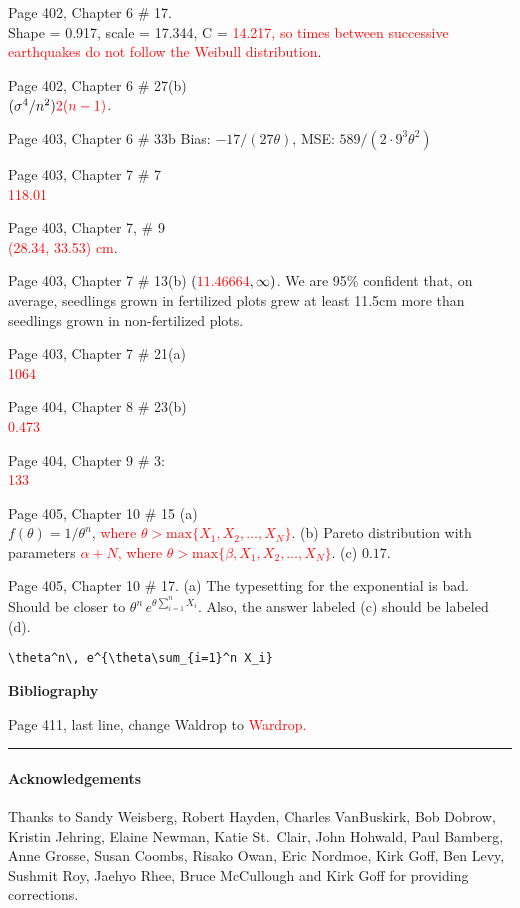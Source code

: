 \documentclass[11pt]{article}
\begin{document}
\bigskip
Page 402, Chapter 6 \# 17. \\
Shape = 0.917, scale = 17.344,
C = \textcolor{red}{14.217, so times between successive earthquakes do
not follow the Weibull distribution}.

\bigskip
Page 402, Chapter 6 \# 27(b) \\
$(\sigma^4/n^2)\color{red}{2(n-1)}$.


\bigskip %
Page 403, Chapter 6 \# 33b Bias: $-17/(27\theta)$, MSE: $589/(2\cdot 9^3\theta^2)$

\bigskip
Page 403, Chapter 7 \# 7 \\
\textcolor{red}{118.01}

\bigskip
Page 403, Chapter 7, \# 9\\
\textcolor{red}{(28.34, 33.53) cm}.

\bigskip %
Page 403, Chapter 7 \# 13(b) $(\textcolor{red}{11.46664}, \infty)$.
We are 95\% confident that, on average,
seedlings grown in fertilized plots grew at least 11.5cm more than seedlings grown
in non-fertilized plots.

\bigskip %
Page 403, Chapter 7 \# 21(a)\\
\textcolor{red}{1064}

\bigskip %
Page 404, Chapter 8 \# 23(b)\\
\textcolor{red}{0.473}

\bigskip
Page 404, Chapter 9 \# 3: \\
\textcolor{red}{133}

\bigskip
Page 405, Chapter 10 \# 15 (a)\\
 $f(\theta)=1/\theta^n$, \textcolor{red}{where $\theta > \mbox{max}\{X_1, X_2, \dots, X_N\}$}.
(b)  Pareto distribution with parameters \textcolor{red}{$\alpha+N$, where
$\theta >\mbox{max} \{\beta, X_1, X_2, \dots, X_N\}$}. (c) $0.17$.

\bigskip
Page 405,  Chapter 10 \# 17. (a) The typesetting for the exponential is bad. Should be closer to
$\theta^n\, e^{\theta\sum_{i=1}^n X_i}$. Also, the answer labeled (c) should be labeled (d).

\begin{verbatim}
\theta^n\, e^{\theta\sum_{i=1}^n X_i}
\end{verbatim}

\bigskip
{\bf Bibliography}

Page 411, last line, change Waldrop to \textcolor{red}{Wardrop.}

\bigskip
\hrule
\bigskip

\paragraph{Acknowledgements}
Thanks to Sandy Weisberg, Robert Hayden, Charles VanBuskirk, Bob Dobrow,
Kristin Jehring, Elaine Newman, Katie St.~Clair, John Hohwald, Paul Bamberg, Anne Grosse,
Susan Coombs, Risako Owan, Eric Nordmoe, Kirk Goff, Ben Levy, Sushmit Roy, Jaehyo Rhee, Bruce McCullough
and Kirk Goff for providing corrections.
\end{document}
